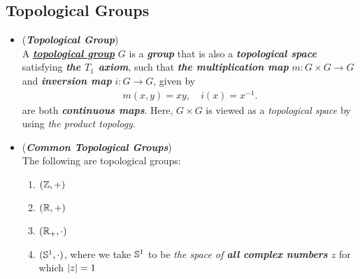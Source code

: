 \documentclass[11pt]{article}
\begin{document}
\subsection{Topological Groups}
\begin{itemize}
\item \begin{definition} (\emph{\textbf{Topological Group}})\\
A \underline{\emph{\textbf{topological group}}} $G$ is a \emph{\textbf{group}} that is also a \emph{\textbf{topological space}} satisfying \emph{\textbf{the $T_1$ axiom}}, such that  \emph{\textbf{the multiplication map}} $m: G \times G \rightarrow G$ and \emph{\textbf{inversion map}} $i: G \rightarrow G$, given by
\begin{align*}
m(x, y) = x y, \quad i(x) = x^{-1}.
\end{align*} are both \emph{\textbf{continuous maps}}. Here, $G\times G$ is viewed as a \emph{topological space} by using \emph{the product topology}.
\end{definition}

\item \begin{example} (\emph{\textbf{Common Topological Groups}})\\
The following are topological groups:
\begin{enumerate}
\item $({\mathbb Z}, +)$
\item $({\mathbb R}, +)$
\item $({\mathbb R}_{+}, \cdot)$
\item $({\mathbb S}^1, \cdot)$, where we take ${\mathbb S}^1$ to be \emph{the space of \textbf{all complex numbers} $z$} for which $\left\lvert z \right\rvert = 1$
\end{enumerate}
\end{example}


\end{itemize}
\end{document}
